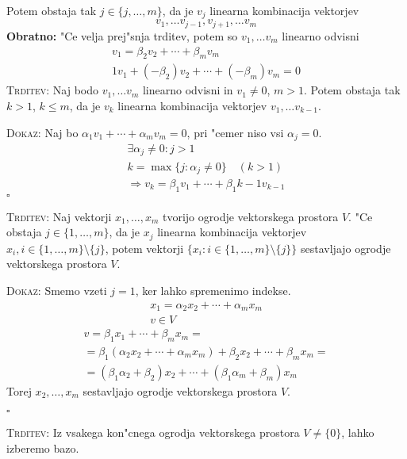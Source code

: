 Potem obstaja tak $j \in \{j, \ldots, m\}$, da je $v_j$ linearna kombinacija vektorjev
\begin{equation*}
v_1, \ldots v_{j-1}, v_{j+1}, \ldots v_m
\end{equation*}
\textbf{Obratno:} "Ce velja prej"snja trditev, potem so $v_1, \ldots v_m$ linearno odvisni
\begin{gather*}
v_1 = \beta_2 v_2 + \cdots + \beta_m v_m \\
1 v_1 + (-\beta_2)v_2 + \cdots + (-\beta_m)v_m = 0
\end{gather*}
%
\textsc{Trditev:} Naj bodo $v_1, \ldots v_m$ linearno odvisni in $v_1 \neq 0$, $m > 1$. Potem obstaja tak $k > 1$, $k \leq m$, da je $v_k$ linearna kombinacija vektorjev $v_1, \ldots v_{k-1}$.

\textsc{Dokaz:} Naj bo $\alpha_1 v_1 + \cdots + \alpha_m v_m = 0$, pri "cemer niso vsi $\alpha_j = 0$.
\begin{gather*}
\exists \alpha_j \neq 0: j > 1 \\
k = \max \{j: \alpha_j \neq 0\} \quad (k > 1) \\
\Rightarrow v_k = \beta_1 v_1 + \cdots + \beta_1{k-1}v_{k-1}
\end{gather*}
\hfill $\square$

\textsc{Trditev:} Naj vektorji $x_1, \ldots, x_m$ tvorijo ogrodje vektorskega prostora $V$. "Ce obstaja $j \in \{1, \ldots, m\}$, da je $x_j$ linearna kombinacija vektorjev $x_i, i \in \{1, \ldots, m\} \setminus \{j\}$, potem vektorji $\{x_i: i \in \{1, \ldots, m\} \setminus \{j\}\}$ sestavljajo ogrodje vektorskega prostora $V$.

\textsc{Dokaz:} Smemo vzeti $j=1$, ker lahko spremenimo indekse.
\begin{gather*}
x_1 = \alpha_2 x_2 + \cdots + \alpha_m x_m\\
v \in V
\end{gather*}
\begin{multline*}
v = \beta_1 x_1 + \cdots + \beta_m x_m = \\
= \beta_1 (\alpha_2 x_2 + \cdots + \alpha_m x_m) + \beta_2 x_2 + \cdots + \beta_m x_m = \\
= (\beta_1 \alpha_2 + \beta_2)x_2 + \cdots + (\beta_1 \alpha_m + \beta_m)x_m
\end{multline*}
Torej $x_2, \ldots, x_m$ sestavljajo ogrodje vektorskega prostora $V$.

\hfill $\square$

\textsc{Trditev:} Iz vsakega kon"cnega ogrodja vektorskega prostora $V \neq \{0\}$, lahko izberemo bazo.

